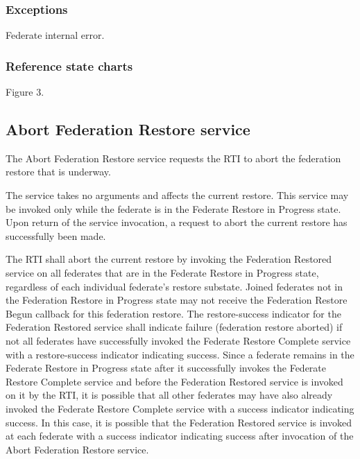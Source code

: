 \subsubsection{Exceptions}

\begin{stdalphalist}
    \item Federate internal error.
\end{stdalphalist}

\subsubsection{Reference state charts}

\begin{stdalphalist}
    \item Figure 3.
\end{stdalphalist}

\subsection{Abort Federation Restore service}

The Abort Federation Restore service requests the RTI to abort the federation restore that is underway.

The service takes no arguments and affects the current restore. This service may be invoked only while the federate is in the Federate Restore in Progress state. Upon return of the service invocation, a request to abort the current restore has successfully been made.

The RTI shall abort the current restore by invoking the Federation Restored \rtiinitiated{} service on all federates that are in the Federate Restore in Progress state, regardless of each individual federate's restore substate. Joined federates not in the Federation Restore in Progress state may not receive the Federation Restore Begun \rtiinitiated{} callback for this federation restore. The restore-success indicator for the Federation Restored \rtiinitiated{} service shall indicate failure (federation restore aborted) if not all federates have successfully invoked the Federate Restore Complete service with a restore-success indicator indicating success. Since a federate remains in the Federate Restore in Progress state after it successfully invokes the Federate Restore Complete service and before the Federation Restored \rtiinitiated{} service is invoked on it by the RTI, it is possible that all other federates may have also already invoked the Federate Restore Complete service with a success indicator indicating success. In this case, it is possible that the Federation Restored \rtiinitiated{} service is invoked at each federate with a success indicator indicating success after invocation of the Abort Federation Restore service.


